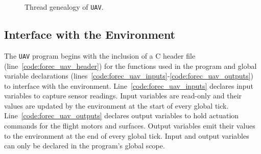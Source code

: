 \begin{figure}
	\centering

	
	\caption{Thread genealogy of \texttt{UAV}.}
	\label{fig:forec_uav_genealogy}
\end{figure}



\subsection{Interface with the Environment}
\label{sec:forecLanguage_io}
The \verb$UAV$ program begins with the inclusion of a C header file 
(line~\ref{code:forec_uav_header}) for the functions used in the 
program and global variable declarations 
(lines~\ref{code:forec_uav_inputs}-\ref{code:forec_uav_outputs}) to 
interface with the environment. Line~\ref{code:forec_uav_inputs}
declares input variables to capture sensor readings. Input 
variables are read-only and their values are 
updated by the environment at the start of every global tick. 
Line~\ref{code:forec_uav_outputs} declares output variables to
hold actuation commands for the flight motors and surfaces.
Output variables emit their values to the environment at 
the end of every global tick. Input and output variables can only be 
declared in the program's global scope.



